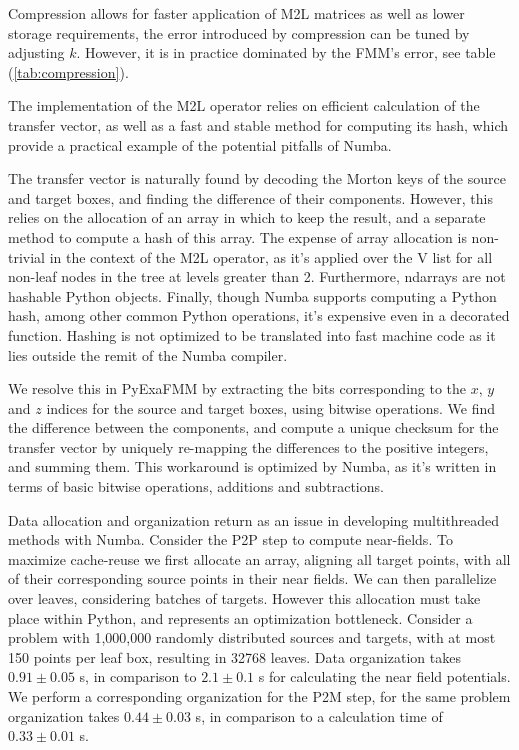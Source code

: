 \documentclass{IEEEcsmag}
\begin{document}
Compression allows for faster application of M2L matrices as well as lower storage requirements, the error introduced by compression can be tuned by adjusting $k$. However, it is in practice dominated by the FMM's error, see table (\ref{tab:compression}).

The implementation of the M2L operator relies on efficient calculation of the transfer vector, as well as a fast and stable method for computing its hash, which provide a practical example of the potential pitfalls of Numba.

The transfer vector is naturally found by decoding the Morton keys of the source and target boxes, and finding the difference of their components. However, this relies on the allocation of an array in which to keep the result, and a separate method to compute a hash of this array. The expense of array allocation is non-trivial in the context of the M2L operator, as it's applied over the V list for all non-leaf nodes in the tree at levels greater than 2. Furthermore, ndarrays are not hashable Python objects. Finally, though Numba supports computing a Python hash, among other common Python operations, it's expensive even in a decorated function. Hashing is not optimized to be translated into fast machine code as it lies outside the remit of the Numba compiler.

We resolve this in PyExaFMM by extracting the bits corresponding to the $x$, $y$ and $z$ indices for the source and target boxes, using bitwise operations. We find the difference between the components, and compute a unique checksum for the transfer vector by uniquely re-mapping the differences to the positive integers, and summing them. This workaround is optimized by Numba, as it's written in terms of basic bitwise operations, additions and subtractions.

Data allocation and organization return as an issue in developing multithreaded methods with Numba. Consider the P2P step to compute near-fields. To maximize cache-reuse we first allocate an array, aligning all target points, with all of their corresponding source points in their near fields. We can then parallelize over leaves, considering batches of targets. However this allocation must take place within Python, and represents an optimization bottleneck. Consider a problem with 1,000,000 randomly distributed sources and targets, with at most 150 points per leaf box, resulting in 32768 leaves. Data organization takes $0.91 \pm 0.05$ s, in comparison to $2.1 \pm 0.1$ s for calculating the near field potentials. We perform a corresponding organization for the P2M step, for the same problem organization takes $0.44 \pm 0.03$ s, in comparison to a calculation time of $0.33 \pm 0.01$ s.
\end{document}
